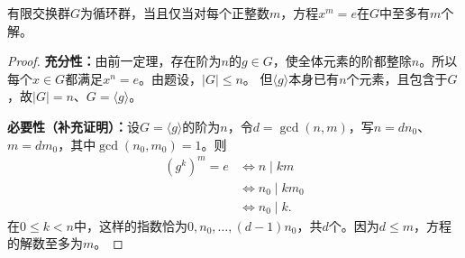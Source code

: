 \begin{theorem}\label{p2:cyclic-root-count}
有限交换群$G$为循环群，当且仅当对每个正整数$m$，方程$x^m=e$在$G$中至多有$m$个解。
\end{theorem}
\begin{proof}
\textbf{充分性：}由前一定理，存在阶为$n$的$g\in G$，使全体元素的阶都整除$n$。所以每个$x\in G$都满足$x^n=e$。由题设，$|G|\leq n$。
但$\langle g\rangle$本身已有$n$个元素，且包含于$G$，故$|G|=n$、$G=\langle g\rangle$。

\textbf{必要性（补充证明）：}设$G=\langle g\rangle$的阶为$n$，令$d=\gcd(n,m)$，写$n=dn_0$、$m=dm_0$，其中$\gcd(n_0,m_0)=1$。则
\begin{align*}
(g^k)^m=e
&\iff n\mid km\\
&\iff n_0\mid km_0\\
&\iff n_0\mid k.
\end{align*}
在$0\leq k<n$中，这样的指数恰为$0,n_0,\ldots,(d-1)n_0$，共$d$个。因为$d\leq m$，方程的解数至多为$m$。
\end{proof}
